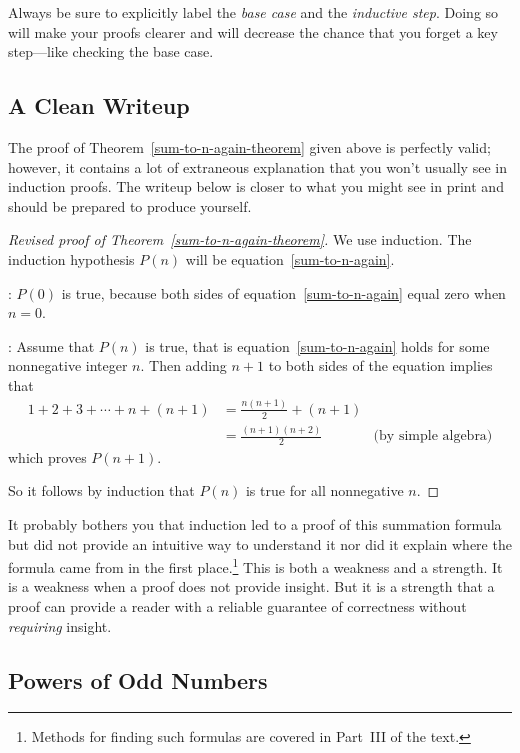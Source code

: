 Always be sure to explicitly label the \emph{base case} and the
\emph{inductive step}.  Doing so will make your proofs clearer and
will decrease the chance that you forget a key step---like checking
the base case.

\subsection{A Clean Writeup}

The proof of Theorem~\ref{sum-to-n-again-theorem} given above is
perfectly valid; however, it contains a lot of extraneous explanation
that you won't usually see in induction proofs.  The writeup below is
closer to what you might see in print and should be prepared to
produce yourself.

\begin{proof}[Revised proof of Theorem~\ref{sum-to-n-again-theorem}]
We use induction.  The induction hypothesis $P(n)$ will be
equation~\eqref{sum-to-n-again}.

: $P(0)$ is true, because both sides of
equation~\eqref{sum-to-n-again} equal zero when $n=0$.

: Assume that $P(n)$ is true, that is
equation~\eqref{sum-to-n-again} holds for some nonnegative integer
$n$.  Then adding $n+1$ to both sides of the equation implies that
\begin{align*}
1 + 2 + 3 + \cdots + n + (n+1)
    & = \frac{n(n+1)}{2} + (n+1)\\\iffalse  & \text{(by induction hypothesis)} \fi
    & = \frac{(n+1)(n+2)}{2}  & \text{(by simple algebra)}
\end{align*}
which proves $P(n+1)$.

So it follows by induction that $P(n)$ is true for all nonnegative $n$.
\end{proof}

It probably bothers you that induction led to a proof of this
summation formula but did not provide an intuitive way to understand
it nor did it explain where the formula came from in the first
place.\footnote{Methods for finding such formulas are covered in
  Part~III of the text.}  This is both a weakness and a strength.  It
is a weakness when a proof does not provide insight.  But it is a
strength that a proof can provide a reader with a reliable guarantee
of correctness without \emph{requiring} insight.

\iffalse
\subsection{Powers of Odd Numbers}

